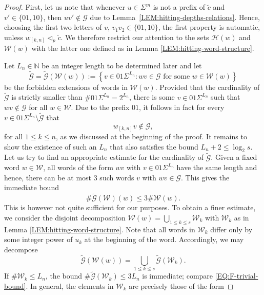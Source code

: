 \documentclass[11pt,reqno]{amsart}
\theoremstyle{plain}
\theoremstyle{definition}
\newcommand{\N}{{\mathbb N}}
\newcommand{\mc}{\mathcal}
\begin{document}
\begin{proof}
First, let us note that whenever $u \in \Sigma^m$ is not a prefix of $\breve{c}$ and $v' \in \{01,10\}$, then $u v' \notin \mc G$ due to Lemma~\ref{LEM:hitting-depths-relations}. 
Hence, choosing the first two letters of $v$, $v_1 v_2 \in \{01,10 \}$, the first property is automatic, unless $w_{[k,n]} \triangleleft_p \breve{c}$.
We therefore restrict our attention to the sets $\mc H(w)$ and $\mc W(w)$ with the latter one defined as in Lemma \ref{LEM:hitting-word-structure}.


Let $L_n \in \N$ be an integer length to be determined later and let
\[
\widetilde{ \mc G} = \widetilde{ \mc G}(\mc W(w)) := \left\{ v \in 01\Sigma^{L_n} : wv \in \mc G \mbox{ for some } w \in \mc W(w) \right\}
\]
be the forbidden extensions of words in $\mc W(w)$.
Provided that the cardinality of $\widetilde{\mc G}$ is strictly smaller than $\# 01 \Sigma^{L_n} = 2^{ L_n}$, there is some $v \in 01\Sigma^{L_n}$ such that $wv \notin \mc G$ for all $w \in \mc W$. Due to the prefix $01$, it follows in fact for every $v \in 01\Sigma^{L_n} \setminus \widetilde{\mc G}$ that
\begin{equation}
\label{EQ:not-in-F}
w_{[k,n]} v \notin \mc G,
\end{equation}
for all $1\leqslant k \leqslant n$, as we discussed at the beginning of the proof. It remains to show the existence of such an $L_n$ that also satisfies the bound $L_n + 2 \leqslant \log_2 s $. 
Let us try to find an appropriate estimate for the cardinality of $\widetilde{\mc G}$. Given a fixed word $w \in \mc W$, all words of the form $wv$ with $v \in 01\Sigma^{L_n}$ have the same length and hence, there can be at most $3$ such words $v$ with $wv \in \mc G$. This gives the immediate bound 
\begin{equation}
\label{EQ:F-trivial-bound}
\# \widetilde{\mc G}(\mc W)(w) \leqslant 3 \#\mc W(w). 
\end{equation}
This is however not quite sufficient for our purposes. To obtain a finer estimate, we consider the disjoint decomposition $\mc W(w) = \bigcup_{1\leqslant k \leqslant s} \mc W_k$ with $\mc W_k$ as in Lemma \ref{LEM:hitting-word-structure}.
Note that all words in $\mc W_k$ differ only by some integer power of $u_k$ at the beginning of the word. 
Accordingly, we may decompose
\[
\widetilde{\mc G}(\mc W(w)) = \bigcup_{1 \leqslant k \leqslant s}  \widetilde{\mc G}(\mc W_k). 
\]
If $\# \mc W_k \leqslant {L_n}$, the bound $\# \widetilde{\mc G}(\mc W_k) \leqslant 3 { L_n}$ is immediate; compare \eqref{EQ:F-trivial-bound}. In general, the elements in $\mc W_k$ are precisely those of the form

\end{proof}
\end{document}
